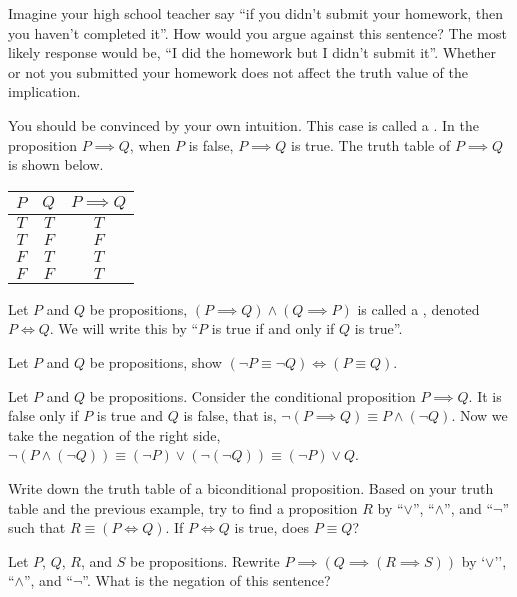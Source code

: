 \documentclass[10pt]{article}
\begin{document}
\par
Imagine your high school teacher say ``if you didn't submit your homework, then you haven't completed it''. How would you argue against this sentence? The most likely response would be, ``I did the homework but I didn't submit it''. Whether or not you submitted your homework does not affect the truth value of the implication.
\par
You should be convinced by your own intuition. This case is called a . In the proposition $P\implies Q$, when $P$ is false, $P\implies Q$ is true. The truth table of $P\implies Q$ is shown below.
\begin{center}
    \begin{tabular}{cc|c}
        $P$ & $Q$ & $P\implies Q$ \\
        \hline
        $T$ & $T$ & $T$ \\
        $T$ & $F$ & $F$ \\
        $F$ & $T$ & $T$ \\
        $F$ & $F$ & $T$
    \end{tabular}
\end{center}
\par
Let $P$ and $Q$ be propositions, $(P\implies Q)\wedge(Q\implies P)$ is called a , denoted $P\iff Q$. We will write this by ``$P$ is true if and only if $Q$ is true''.
\begin{problem}
    Let $P$ and $Q$ be propositions, show $(\neg P\equiv\neg Q)\iff(P\equiv Q)$.
\end{problem}
\begin{example}
    Let $P$ and $Q$ be propositions. Consider the conditional proposition $P\implies Q$. It is false only if $P$ is true and $Q$ is false, that is, $\neg(P\implies Q)\equiv P\wedge(\neg Q)$. Now we take the negation of the right side, $\neg(P\wedge(\neg Q))\equiv(\neg P)\vee(\neg(\neg Q))\equiv(\neg P)\vee Q$.
\end{example}
\begin{problem}
    Write down the truth table of a biconditional proposition. Based on your truth table and the previous example, try to find a proposition $R$ by ``$\vee$'', ``$\wedge$'', and ``$\neg$'' such that $R\equiv(P\iff Q)$. If $P\iff Q$ is true, does $P\equiv Q$?
\end{problem}
\begin{problem}
    Let $P$, $Q$, $R$, and $S$ be propositions. Rewrite $P\implies(Q\implies(R\implies S))$ by `$\vee$'', ``$\wedge$'', and ``$\neg$''. What is the negation of this sentence?
\end{problem}
\end{document}
